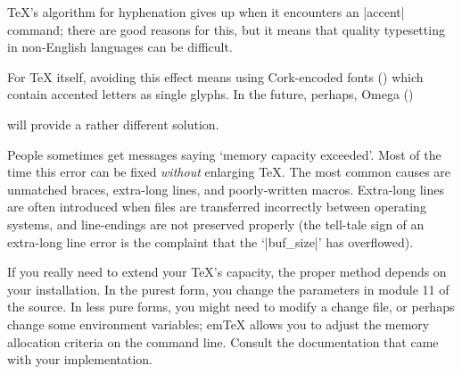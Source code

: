\begin{changemargin}{-1cm}{-1cm}

\TeX{}'s algorithm for hyphenation gives up when it encounters an
\cs|accent| command; there are good reasons for this, but it means
that quality typesetting in non-English languages can be difficult.

For \TeX{} itself, avoiding this effect means using Cork-encoded fonts
() which contain accented letters as
single glyphs.  In the future, perhaps,
\htmlignore
Omega ()
\endhtmlignore
\begin{htmlversion}
\end{htmlversion}
will provide a rather different solution.


People sometimes get messages saying `memory capacity exceeded'.
Most of the time this error can be fixed
\emph{without} enlarging \TeX{}. The most common causes are unmatched braces,
extra-long lines, and poorly-written macros. Extra-long lines are
often introduced when files are transferred incorrectly between
operating systems, and line-endings are not preserved properly (the
tell-tale sign of an extra-long line error is the complaint
that the `|buf_size|' has overflowed).

If you really need to extend your \TeX{}'s capacity, the proper method
depends on your installation. In the purest form, you
change the parameters in module 11 of the  source.
In less pure forms, you might need to modify a
change file, or perhaps change some environment variables; em\TeX{}
allows you to adjust the memory allocation criteria on the command
line.  Consult the documentation that came with your implementation.



\end{changemargin}

